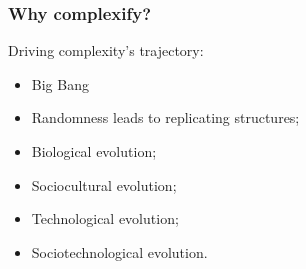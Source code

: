 \begin{frame}
  \frametitle{Why complexify?}

  \begin{block}{Driving complexity's trajectory:}
    \begin{itemize}
    \item 
      Big Bang
    \item 
      Randomness leads to replicating structures;
    \item 
      Biological evolution;
    \item 
      Sociocultural evolution;
    \item 
      Technological evolution;
    \item 
      Sociotechnological evolution.
    \end{itemize}
  \end{block}

\end{frame}


